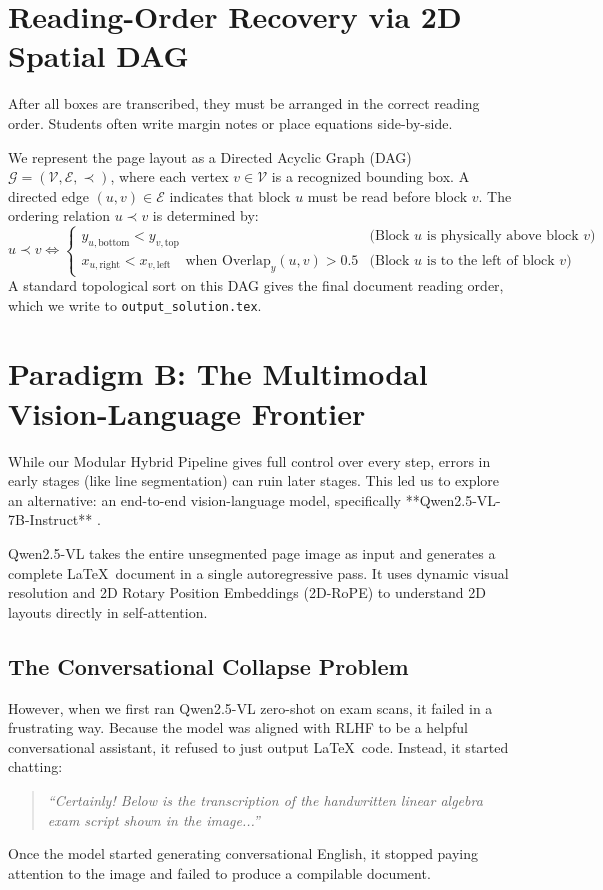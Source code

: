 \section{Reading-Order Recovery via 2D Spatial DAG}
\label{sec:spatial_dag}

After all boxes are transcribed, they must be arranged in the correct reading order. Students often write margin notes or place equations side-by-side. 

We represent the page layout as a Directed Acyclic Graph (DAG) $\mathcal{G} = (\mathcal{V}, \mathcal{E}, \prec)$, where each vertex $v \in \mathcal{V}$ is a recognized bounding box. A directed edge $(u, v) \in \mathcal{E}$ indicates that block $u$ must be read before block $v$. The ordering relation $u \prec v$ is determined by:
\begin{equation}
u \prec v \iff \begin{cases}
y_{u, \text{bottom}} < y_{v, \text{top}} & \text{(Block $u$ is physically above block $v$)} \\
x_{u, \text{right}} < x_{v, \text{left}} \quad \text{when } \text{Overlap}_y(u, v) > 0.5 & \text{(Block $u$ is to the left of block $v$)}
\end{cases}
\end{equation}
A standard topological sort on this DAG gives the final document reading order, which we write to \texttt{output\_solution.tex}.

\section{Paradigm B: The Multimodal Vision-Language Frontier}
\label{sec:paradigm_b_overview}

While our Modular Hybrid Pipeline gives full control over every step, errors in early stages (like line segmentation) can ruin later stages. This led us to explore an alternative: an end-to-end vision-language model, specifically **Qwen2.5-VL-7B-Instruct** \cite{wang2024qwen2vl}.

Qwen2.5-VL takes the entire unsegmented page image as input and generates a complete \LaTeX\ document in a single autoregressive pass. It uses dynamic visual resolution and 2D Rotary Position Embeddings (2D-RoPE) \cite{su2024roformer} to understand 2D layouts directly in self-attention.

\subsection{The Conversational Collapse Problem}
However, when we first ran Qwen2.5-VL zero-shot on exam scans, it failed in a frustrating way. Because the model was aligned with RLHF to be a helpful conversational assistant, it refused to just output \LaTeX\ code. Instead, it started chatting:
\begin{quote}
\emph{``Certainly! Below is the transcription of the handwritten linear algebra exam script shown in the image...''}
\end{quote}
Once the model started generating conversational English, it stopped paying attention to the image and failed to produce a compilable document.

